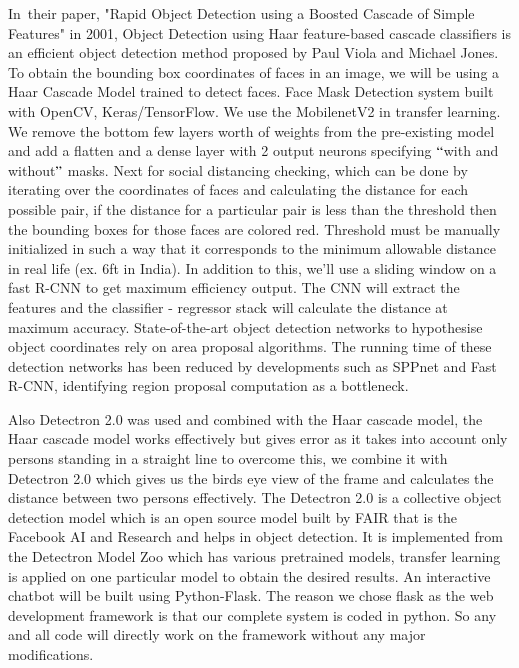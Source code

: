 \documentclass[12pt]{article}
\begin{document}
\vspace{\baselineskip}
\setlength{\parskip}{9.96pt}
\setlength{\parskip}{0.0pt}
\begin{justify}
In\ their paper, "Rapid Object Detection using a Boosted Cascade of Simple Features" in 2001, Object Detection using Haar feature-based cascade classifiers is an efficient object detection method proposed by Paul Viola and Michael Jones. To obtain the bounding box coordinates of faces in an image, we will be using a Haar Cascade Model trained to detect faces. Face Mask Detection system built with OpenCV, Keras/TensorFlow. We use the MobilenetV2 in transfer learning. We remove the bottom few layers worth of weights from the pre-existing model and add a flatten and a dense layer with 2 output neurons specifying $``$with and without$"$  masks. Next for social distancing checking, which can be done by iterating over the coordinates of faces and calculating the distance for each possible pair, if the distance for a particular pair is less than  the threshold then the bounding boxes for those faces are colored red. Threshold must be manually initialized in such a way that it corresponds to the minimum allowable distance in real life (ex. 6ft in India). In addition to this, we’ll use a sliding window on a fast R-CNN to get maximum efficiency output. The CNN will extract the features and the classifier - regressor stack will calculate the distance at maximum accuracy. State-of-the-art object detection networks to hypothesise object coordinates rely on area proposal algorithms. The running time of these detection networks has been reduced by developments such as SPPnet and Fast R-CNN, identifying region proposal computation as a bottleneck.
\end{justify}

\vspace{\baselineskip}
\setlength{\parskip}{9.96pt}
\setlength{\parskip}{0.0pt}
\begin{justify}
Also Detectron 2.0 was used and combined with the Haar cascade model, the Haar cascade model works effectively but gives error as it takes into account only persons standing in a straight line to overcome this, we combine it with Detectron 2.0 which gives us the birds eye view of the frame and calculates the distance between two persons effectively. The Detectron 2.0 is a collective object detection model which is an open source model built by FAIR that is the Facebook AI and Research and helps in object detection. It is implemented from the Detectron Model Zoo which has various pretrained models, transfer learning is applied on one particular model to obtain the desired results. An interactive chatbot will be built using Python-Flask. The reason we chose flask as the web development framework is that our complete system is coded in python. So any and all code will directly work on the framework without any major modifications.
\end{justify}
\end{document}
